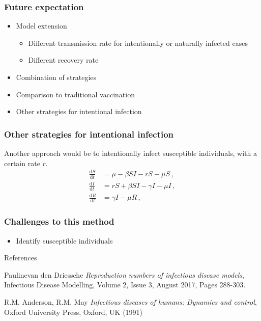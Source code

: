 \documentclass[12pt]{beamer}
\newcommand\dbyd[2]{\frac{\mathrm d{#1}}{\mathrm d{#2}}}
\begin{document}
\begin{frame}
\frametitle{Future expectation}
\begin{itemize}\itemsep10pt
\item Model extension
\pause
\begin{itemize}\itemsep10pt
\item Different transmission rate for intentionally or naturally infected cases
\pause
\item Different recovery rate
\end{itemize}
\pause
\item Combination of strategies
\pause
\item Comparison to traditional vaccination
\pause
\item Other strategies for intentional infection
\end{itemize}
\end{frame}
\begin{frame}
\frametitle{Other strategies for intentional infection}

Another approach would be to intentionally infect susceptible individuals, with a certain rate $r$.
\pause
\begin{equation}
\begin{split}
\dbyd{S}{t}&=\mu- \beta SI-rS-\mu S\,, \\
\dbyd{I}{t}&=rS+\beta SI-\gamma I -\mu I\,,\\
\dbyd{R}{t}&=\gamma I-\mu R\,,
\end{split}
\end{equation}
\end{frame}
\begin{frame}
\frametitle{Challenges to this method}
\begin{itemize}
\item Identify susceptible individuals
\end{itemize}
\end{frame}
\begin{frame}{References}
\begin{thebibliography}{9}
Paulinevan den Driessche \emph{Reproduction numbers of infectious disease models}, Infectious Disease Modelling, Volume 2, Issue 3, August 2017, Pages 288-303.

R.M. Anderson, R.M. May
\emph{Infectious diseases of humans: Dynamics and control}, Oxford University Press, Oxford, UK (1991)
\end{thebibliography}
\end{frame}
\end{document}
